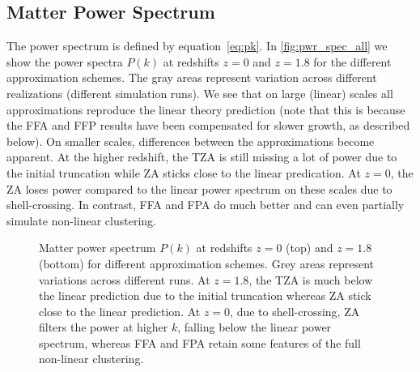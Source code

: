\subsection{Matter Power Spectrum}
\label{sec:pwr_spec}
The power spectrum is defined by equation~\eqref{eq:pk}. In \autoref{fig:pwr_spec_all} we show the power spectra $P(k)$ at redshifts $z=0$ and $z=1.8$ for the different approximation schemes. The gray areas represent variation across different realizations (different simulation runs). We see that on large (linear) scales all approximations reproduce the linear theory prediction (note that this is because the FFA and FFP results have been compensated for slower growth, as described below). On smaller scales, differences between the approximations become apparent. At the higher redshift, the TZA is still missing a lot of power due to the initial truncation while ZA sticks close to the linear predication. At $z=0$, the ZA loses power compared to the linear power spectrum on these scales due to shell-crossing. In contrast, FFA and FPA do much better and can even partially simulate non-linear clustering.

\begin{figure}[hbt]
\centering
	\begin{subfigure}{0.9\textwidth}
	\end{subfigure}
	\begin{subfigure}{0.9\textwidth}
	\end{subfigure}
	\begin{subfigure}{0.9\textwidth}
	\end{subfigure}%
	\caption{Matter power spectrum $P(k)$ at redshifts $z=0$ (top) and $z=1.8$ (bottom) for different approximation schemes. Grey areas represent variations across different runs. At $z=1.8$, the TZA is much below the linear prediction due to the initial truncation whereas ZA stick close to the linear prediction. At $z=0$, due to shell-crossing, ZA filters the power at higher $k$, falling below the linear power spectrum, whereas FFA and FPA retain some features of the full non-linear clustering.}
    \label{fig:pwr_spec_all}
\end{figure}

